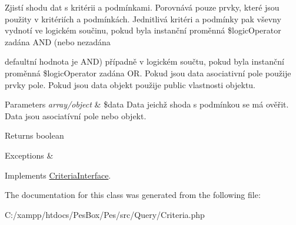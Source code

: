 Zjistí shodu dat s kritérii a podmínkami. Porovnává pouze prvky, které jsou použity v kritériích a podmínkách. Jednitlivá kritéri a podmínky pak vševny vydnotí ve logickém součinu, pokud byla instanční proměnná \$logic\+Operator zadána A\+ND (nebo nezadána
\begin{DoxyItemize}
\item defaultní hodnota je A\+ND) případně v logickém součtu, pokud byla instanční proměnná \$logic\+Operator zadána OR. Pokud jsou data asociativní pole použije prvky pole. Pokud jsou data objekt použije public vlastnosti objektu. 
\begin{DoxyParams}{Parameters}
{\em array/object} & \$data Data jeichž shoda s podmínkou se má ověřit. Data jsou asociatívní pole nebo objekt. \\
\hline
\end{DoxyParams}
\begin{DoxyReturn}{Returns}
boolean 
\end{DoxyReturn}

\begin{DoxyExceptions}{Exceptions}
{\em } & \\
\hline
\end{DoxyExceptions}

\end{DoxyItemize}

Implements \mbox{\hyperlink{interface_pes_1_1_query_1_1_criteria_interface}{Criteria\+Interface}}.



The documentation for this class was generated from the following file\+:\begin{DoxyCompactItemize}
\item 
C\+:/xampp/htdocs/\+Pes\+Box/\+Pes/src/\+Query/Criteria.\+php\end{DoxyCompactItemize}
